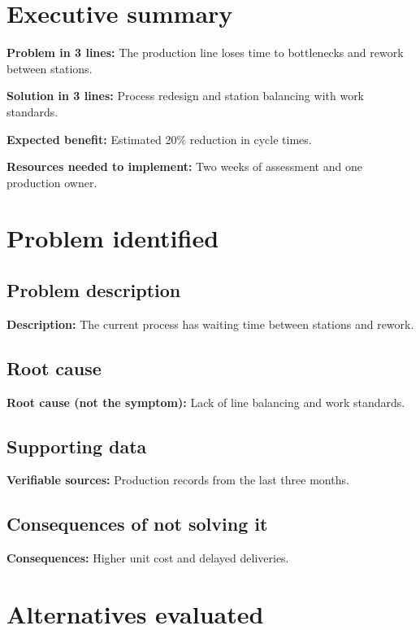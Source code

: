 \documentclass[11pt,a4paper]{article}
\newcommand{\campo}[2]{\noindent\textbf{\textcolor{irdblack}{#1:}} \textcolor{irdblack}{#2}\par\vspace{0.3em}}
\begin{document}
\section{Executive summary}

\begin{infobox}
\campo{Problem in 3 lines}{The production line loses time to bottlenecks and rework between stations.}
\campo{Solution in 3 lines}{Process redesign and station balancing with work standards.}
\campo{Expected benefit}{Estimated 20\% reduction in cycle times.}
\campo{Resources needed to implement}{Two weeks of assessment and one production owner.}
\end{infobox}

\section{Problem identified}

\subsection{Problem description}
\campo{Description}{The current process has waiting time between stations and rework.}

\subsection{Root cause}
\campo{Root cause (not the symptom)}{Lack of line balancing and work standards.}

\subsection{Supporting data}
\campo{Verifiable sources}{Production records from the last three months.}

\subsection{Consequences of not solving it}
\campo{Consequences}{Higher unit cost and delayed deliveries.}

\section{Alternatives evaluated}
\end{document}
